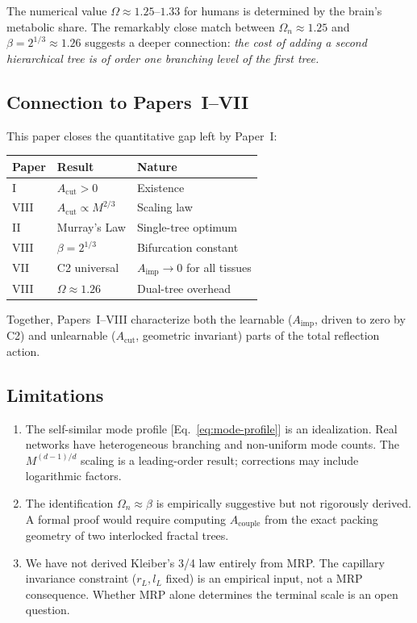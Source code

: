 \documentclass[aps,pre,twocolumn,superscriptaddress,longbibliography]{revtex4-2}
\newcommand{\Acut}{A_{\text{cut}}}
\newcommand{\Aimp}{A_{\text{imp}}}
\newcommand{\Acouple}{A_{\text{couple}}}
\begin{document}
The numerical value $\Omega \approx 1.25$--$1.33$ for
humans is determined by the brain's metabolic share.
The remarkably close match between $\Omega_n \approx 1.25$
and $\beta = 2^{1/3} \approx 1.26$ suggests a deeper
connection:
\emph{the cost of adding a second hierarchical tree is
of order one branching level of the first tree.}

\subsection{Connection to Papers~I--VII}

This paper closes the quantitative gap left by Paper~I:
\begin{center}
\begin{tabular}{lll}
\hline
\textbf{Paper} & \textbf{Result} & \textbf{Nature} \\
\hline
I & $\Acut > 0$ & Existence \\
VIII & $\Acut \propto M^{2/3}$ & Scaling law \\
II & Murray's Law & Single-tree optimum \\
VIII & $\beta = 2^{1/3}$ & Bifurcation constant \\
VII & C2 universal & $\Aimp \to 0$ for all tissues \\
VIII & $\Omega \approx 1.26$ & Dual-tree overhead \\
\hline
\end{tabular}
\end{center}

Together, Papers~I--VIII characterize both the learnable
($\Aimp$, driven to zero by C2) and unlearnable ($\Acut$,
geometric invariant) parts of the total reflection action.

\subsection{Limitations}

\begin{enumerate}
  \item The self-similar mode profile
    [Eq.~\eqref{eq:mode-profile}] is an idealization.
    Real networks have heterogeneous branching and
    non-uniform mode counts.
    The $M^{(d-1)/d}$ scaling is a leading-order result;
    corrections may include logarithmic factors.

  \item The identification $\Omega_n \approx \beta$ is
    empirically suggestive but not rigorously derived.
    A formal proof would require computing $\Acouple$
    from the exact packing geometry of two interlocked
    fractal trees.

  \item We have not derived Kleiber's 3/4 law entirely
    from MRP.  The capillary invariance constraint
    ($r_L, l_L$ fixed) is an empirical input, not a
    MRP consequence.  Whether MRP alone determines
    the terminal scale is an open question.
\end{enumerate}
\end{document}
